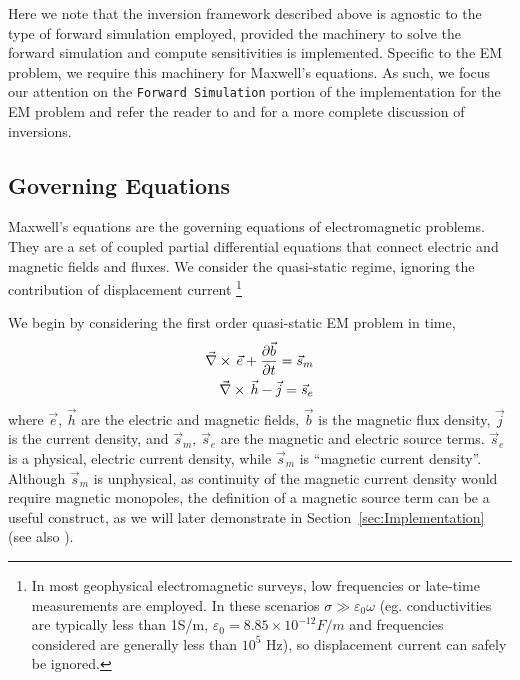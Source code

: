 Here we note that the inversion framework described above is agnostic to the
type of forward simulation employed, provided the machinery to solve the
forward simulation and compute sensitivities is implemented. Specific to the
EM problem, we require this machinery for Maxwell's equations. As such, we
focus our attention  on the \texttt{Forward Simulation} portion of the
implementation for the EM problem and refer the reader to
\cite{Cockett2015} and \cite{Oldenburg2005} for a more complete discussion
of  inversions.



\subsection{Governing Equations}
\label{sec:GoverningEquations}

Maxwell's equations are the governing equations of electromagnetic problems.
They are a set of coupled partial differential equations that connect electric
and magnetic fields and fluxes. We consider the quasi-static regime, ignoring
the contribution of displacement current \citep{Ward1988, Telford1990,
Haber2014a} \footnote{In most geophysical electromagnetic surveys, low frequencies or late-time measurements are employed. In these scenarios $\sigma \gg \varepsilon_0 \omega$ (eg. conductivities are typically less than 1S/m, $\varepsilon_0 = 8.85 \times 10^{-12} F/m$ and frequencies considered are generally less than $10^5$ Hz), so displacement current can safely be ignored.}

We begin by considering the first order quasi-static EM problem in time,
\begin{equation}
\begin{split}
{\vec \nabla}\times\, \vec{e} + \frac{\partial \vec{b}}{\partial t} = \vec{s}_m \\
{\vec \nabla}\times\, \vec{h} - \vec{j} = \vec{s}_e
\end{split}
\label{eq:MaxwellBasicTime}
\end{equation}
where $\vec{e}$, $\vec{h}$ are the electric and magnetic fields, $\vec{b}$ is the magnetic flux density, $\vec{j}$ is the current density, and $\vec{s}_m$, $\vec{s}_e$ are the magnetic and electric source terms. $\vec{s}_e$ is a physical, electric current density, while $\vec{s}_m$ is ``magnetic current density''. Although $\vec{s}_m$ is unphysical, as continuity of the magnetic current density would require magnetic monopoles, the definition of a magnetic source term can be a useful construct, as we will later demonstrate in Section~\ref{sec:Implementation} (see also \cite{Ward1988}).

